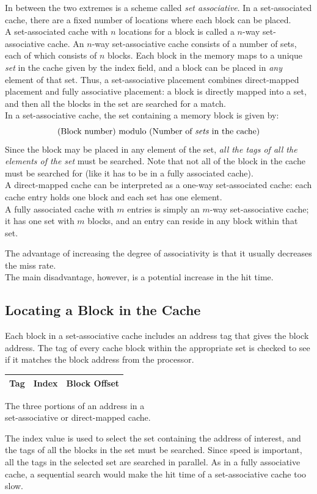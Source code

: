 \documentclass[12pt]{article}
\theoremstyle{definition}
\begin{document}
  In between the two extremes is a scheme called \emph{set associative}.
  In a set-associated cache, there are a fixed number of locations where each block can be placed. \\
  A set-associated cache with $n$ locations for a block is called a $n$-way set-associative cache.
  An $n$-way set-associative cache consists of a number of sets, each of which consists of $n$ blocks.
  Each block in the memory maps to a unique \emph{set} in the cache given by the index field, and a block can be placed in \emph{any} element of that set.
  Thus, a set-associative placement combines direct-mapped placement and fully associative placement: a block is directly mapped into a set, and then all the blocks in the set are searched for a match. \\

  In a set-associative cache, the set containing a memory block is given by:
  $$\text{(Block number) modulo (Number of \emph{sets} in the cache)}$$
  Since the block may be placed in any element of the set, \emph{all the tags of all the elements of the set} must be searched.
  Note that not all of the block in the cache must be searched for (like it has to be in a fully associated cache). \\

  A direct-mapped cache can be interpreted as a one-way set-associated cache: each cache entry holds one block and each set has one element. \\
  A fully associated cache with $m$ entries is simply an $m$-way set-associative cache; it has one set with $m$ blocks, and an entry can reside in any block within that set.

  The advantage of increasing the degree of associativity is that it usually decreases the miss rate. \\
  The main disadvantage, however, is a potential increase in the hit time.

  \subsection{Locating a Block in the Cache}
  Each block in a set-associative cache includes an address tag that gives the block address.
  The tag of every cache block within the appropriate set is checked to see if it matches the block address from the processor.
  \begin{center}
  \begin{tabular}{| C{3cm} | C{3cm} | C{3cm} |}
  \hline
  Tag & Index & Block Offset \\
  \hline
  \end{tabular}
  \newline
  The three portions of an address in a \\ set-associative or direct-mapped cache.
  \end{center}
  The index value is used to select the set containing the address of interest, and the tags of all the blocks in the set must be searched.
  Since speed is important, all the tags in the selected set are searched in parallel.
  As in a fully associative cache, a sequential search would make the hit time of a set-associative cache too slow. \\
\end{document}
